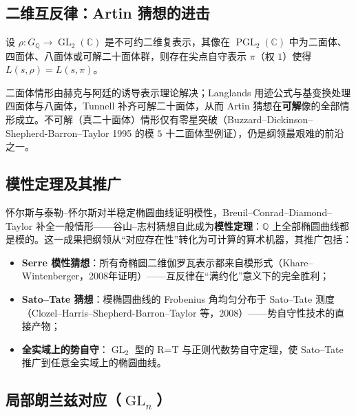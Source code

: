 \subsection{二维互反律：Artin 猜想的进击}

\begin{theorem}\label{thm:langlands-tunnell}
    设 $\rho: G_{\mathbb{Q}} \to \operatorname{GL}_2(\mathbb{C})$ 是不可约二维复表示，其像在 $\operatorname{PGL}_2(\mathbb{C})$ 中为二面体、四面体、八面体或可解二十面体群，则存在尖点自守表示 $\pi$（权 $1$）使得 $L(s,\rho) = L(s,\pi)$。
\end{theorem}

二面体情形由赫克与阿廷的诱导表示理论解决；Langlands 用迹公式与基变换\cite{langlands1980}处理四面体与八面体，Tunnell 补齐可解二十面体\cite{tunnell1981}，从而 Artin 猜想在\textbf{可解}像的全部情形成立。不可解（真二十面体）情形仅有零星突破（Buzzard--Dickinson--Shepherd-Barron--Taylor 1995 的模 $5$ 十二面体型例证），仍是纲领最艰难的前沿之一。

\subsection{模性定理及其推广}

怀尔斯与泰勒--怀尔斯对半稳定椭圆曲线证明模性\cite{wiles1995modular,taylor1995ring}，Breuil--Conrad--Diamond--Taylor 补全一般情形\cite{bcdt2001}——谷山--志村猜想自此成为\textbf{模性定理}：$\mathbb{Q}$ 上全部椭圆曲线都是模的。这一成果把纲领从“对应存在性”转化为可计算的算术机器，其推广包括：

\begin{itemize}
    \item \textbf{Serre 模性猜想}：所有奇椭圆二维伽罗瓦表示都来自模形式（Khare--Wintenberger，2008年证明\cite{khare2009}）——互反律在“满约化”意义下的完全胜利；
    \item \textbf{Sato--Tate 猜想}：模椭圆曲线的 Frobenius 角均匀分布于 Sato--Tate 测度（Clozel--Harris--Shepherd-Barron--Taylor 等，2008）——势自守性技术的直接产物；
    \item \textbf{全实域上的势自守}：$\operatorname{GL}_2$ 型的 R=T 与正则代数势自守定理\cite{blggt2014}，使 Sato--Tate 推广到任意全实域上的椭圆曲线。
\end{itemize}

\subsection{局部朗兰兹对应（$\operatorname{GL}_n$）}

